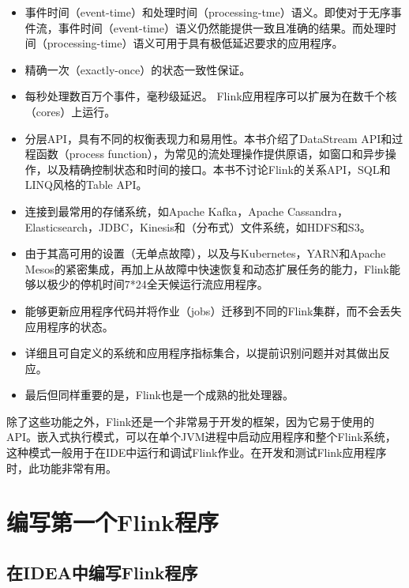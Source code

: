 \documentclass[cn,11pt,chinese]{elegantbook}
\providecommand{\tightlist}{%
  \setlength{\itemsep}{0pt}\setlength{\parskip}{0pt}}
\begin{document}
\begin{itemize}
\tightlist
\item
  事件时间（event-time）和处理时间（processing-tme）语义。即使对于无序事件流，事件时间（event-time）语义仍然能提供一致且准确的结果。而处理时间（processing-time）语义可用于具有极低延迟要求的应用程序。
\item
  精确一次（exactly-once）的状态一致性保证。
\item
  每秒处理数百万个事件，毫秒级延迟。
  Flink应用程序可以扩展为在数千个核（cores）上运行。
\item
  分层API，具有不同的权衡表现力和易用性。本书介绍了DataStream
  API和过程函数（process
  function），为常见的流处理操作提供原语，如窗口和异步操作，以及精确控制状态和时间的接口。本书不讨论Flink的关系API，SQL和LINQ风格的Table
  API。
\item
  连接到最常用的存储系统，如Apache Kafka，Apache
  Cassandra，Elasticsearch，JDBC，Kinesis和（分布式）文件系统，如HDFS和S3。
\item
  由于其高可用的设置（无单点故障），以及与Kubernetes，YARN和Apache
  Mesos的紧密集成，再加上从故障中快速恢复和动态扩展任务的能力，Flink能够以极少的停机时间7*24全天候运行流应用程序。
\item
  能够更新应用程序代码并将作业（jobs）迁移到不同的Flink集群，而不会丢失应用程序的状态。
\item
  详细且可自定义的系统和应用程序指标集合，以提前识别问题并对其做出反应。
\item
  最后但同样重要的是，Flink也是一个成熟的批处理器。
\end{itemize}

除了这些功能之外，Flink还是一个非常易于开发的框架，因为它易于使用的API。嵌入式执行模式，可以在单个JVM进程中启动应用程序和整个Flink系统，这种模式一般用于在IDE中运行和调试Flink作业。在开发和测试Flink应用程序时，此功能非常有用。

\hypertarget{ux7f16ux5199ux7b2cux4e00ux4e2aflinkux7a0bux5e8f}{%
\section{编写第一个Flink程序}\label{ux7f16ux5199ux7b2cux4e00ux4e2aflinkux7a0bux5e8f}}

\hypertarget{ux5728ideaux4e2dux7f16ux5199flinkux7a0bux5e8f}{%
\subsection{在IDEA中编写Flink程序}\label{ux5728ideaux4e2dux7f16ux5199flinkux7a0bux5e8f}}
\end{document}
